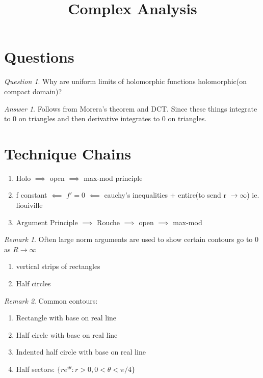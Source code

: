 \documentclass[11pt]{article}
\title{Complex Analysis}
\theoremstyle{remark}
\newtheorem{remark}{Remark}
\newtheorem{quest}{Question}
\newtheorem{ans}{Answer}
\begin{document}
\maketitle

\section{Questions}

\begin{quest}
	Why are uniform limits of holomorphic functions holomorphic(on compact domain)?
\end{quest}

\begin{ans}
	Follows from Morera's theorem and DCT. Since these things integrate to 0 on triangles and then derivative integrates to 0 on triangles.
\end{ans}

\section{Technique Chains}

\begin{enumerate}
	\item Holo $\implies$ open $\implies$ max-mod principle
	\item f constant $\impliedby$ $f' = 0$ $\impliedby$ cauchy's inequalities + entire(to send r $\to \infty$) ie. liouiville
	\item Argument Principle $\implies$ Rouche $\implies$ open $\implies$ max-mod
\end{enumerate}

\begin{remark}
	Often large norm arguments are used to show certain contours go to 0 as $R \to \infty$
	\begin{enumerate}
		\item vertical strips of rectangles
		\item Half circles
	\end{enumerate}
\end{remark}

\begin{remark}
	Common contours:
	\begin{enumerate}
		\item Rectangle with base on real line
		\item Half circle with base on real line
		\item Indented half circle with base on real line
		\item Half sectors: $\{re^{i\theta} : r > 0, 0 < \theta < \pi/4\}$
	\end{enumerate}
\end{remark}
\end{document}
